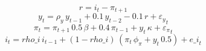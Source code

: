 \begin{dmath*}
r = {i}_{t}-{\pi}_{t+1}
\end{dmath*}
\begin{dmath}
{y}_{t}={\rho_y}\, {y}_{t-1}+0.1\, {y}_{t-2}-0.1\, {r}+{\varepsilon_y}_{t}
\end{dmath}
\begin{dmath}
{\pi}_{t}={\pi}_{t+1}\, 0.5\, {\beta}+0.4\, {\pi}_{t-1}+{y}_{t}\, {\kappa}+{\varepsilon_\pi}_{t}
\end{dmath}
\begin{dmath}
{i}_{t}={rho\_i}\, {i}_{t-1}+\left(1-{rho\_i}\right)\, \left({\pi}_{t}\, {\phi_\pi}+{y}_{t}\, 0.5\right)+{e\_i}_{t}
\end{dmath}
